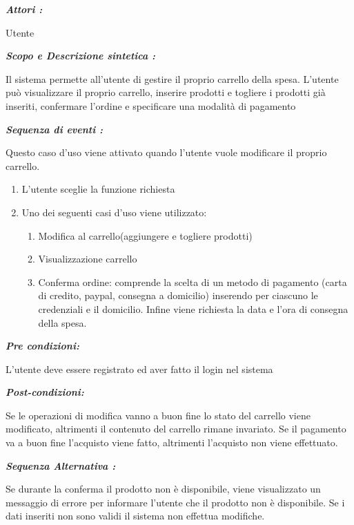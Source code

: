 \documentclass{article}
\begin{document}
\newpage
\begin{mdframed}

	\noindent\textit{\textbf{Attori :}}


	Utente

	\noindent\textit{\textbf{Scopo e Descrizione sintetica :}}


	Il sistema permette all’utente di gestire il proprio carrello della spesa.
	L’utente può visualizzare il proprio carrello,
	inserire prodotti e togliere i prodotti già inseriti, confermare l’ordine e
	specificare una modalità di pagamento

	\noindent\textit{\textbf{Sequenza di eventi :}}


	\hspace{\parindent} Questo caso d’uso viene attivato quando l’utente vuole modificare il proprio carrello.
	\begin{enumerate}
		\item L’utente sceglie la funzione richiesta
		\item Uno dei seguenti casi d’uso viene utilizzato:
		      \begin{enumerate}
			      \item Modifica al carrello(aggiungere e togliere prodotti)
			      \item Visualizzazione carrello
			      \item Conferma ordine:
			            comprende la scelta di un metodo di pagamento
			            (carta di credito, paypal, consegna a domicilio)
			            inserendo per ciascuno le credenziali e il domicilio.
			            Infine viene richiesta la data e l'ora di consegna della spesa.
		      \end{enumerate}
	\end{enumerate}

	\noindent\textit{\textbf{Pre condizioni:}}


	L’utente deve essere registrato ed aver fatto il login 	nel sistema

	\noindent\textit{\textbf{Post-condizioni:}}


	Se le operazioni di modifica vanno a buon fine lo stato del carrello viene modificato,
	altrimenti il contenuto del carrello rimane invariato.
	Se il pagamento va a buon fine l’acquisto viene fatto, altrimenti l’acquisto
	non viene effettuato.

	\noindent\textit{\textbf{Sequenza Alternativa :}}


	Se durante la conferma il prodotto non è disponibile, viene visualizzato un
	messaggio di errore per informare l’utente che il prodotto non è disponibile.
	Se i dati inseriti non sono validi il sistema non effettua modifiche.
\end{mdframed}
\end{document}
